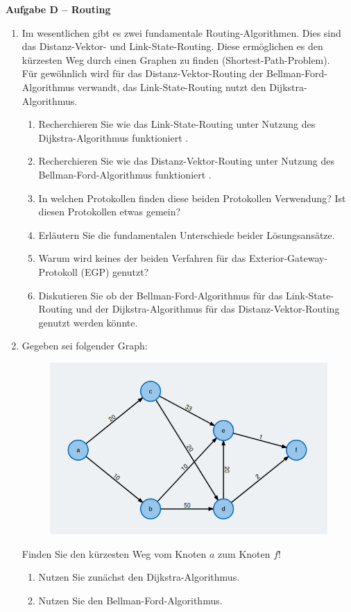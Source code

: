 \documentclass[paper=a4,fontsize=11pt]{scrartcl}%
\numberwithin{equation}{section}
\begin{document}
\begin{center}\Large{\textbf{Aufgabe D -- Routing}}\end{center}\vskip0.2in
\begin{enumerate}
	\item Im wesentlichen gibt es zwei fundamentale Routing-Algorithmen. Dies sind das Distanz-Vektor- und Link-State-Routing. Diese ermöglichen es den kürzesten Weg durch einen Graphen zu finden (Shortest-Path-Problem).\\
	Für gewöhnlich wird für das Distanz-Vektor-Routing der Bellman-Ford-Algorithmus verwandt, das Link-State-Routing nutzt den Dijkstra-Algorithmus. \cite[S. 363ff]{Kurose2012}
	\begin{enumerate}
		\item Recherchieren Sie wie das Link-State-Routing unter Nutzung des Dijkstra-Algorithmus funktioniert \cite[S. 366]{Kurose2012}.
		\item Recherchieren Sie wie das Distanz-Vektor-Routing unter Nutzung des Bellman-Ford-Algorithmus funktioniert  \cite[S. 371]{Kurose2012}.
		\item In welchen Protokollen finden diese beiden Protokollen Verwendung? Ist diesen Protokollen etwas gemein?
		\item Erläutern Sie die fundamentalen Unterschiede beider Lösungsansätze.
		\item Warum wird keines der beiden Verfahren für das Exterior-Gateway-Protokoll (EGP) genutzt?
		\item Diskutieren Sie ob der Bellman-Ford-Algorithmus für das Link-State-Routing und der Dijkstra-Algorithmus für das Distanz-Vektor-Routing genutzt werden könnte.
	\end{enumerate}
	\item Gegeben sei folgender Graph:
	\begin{figure}[H]
		\centering
		\includegraphics[scale=0.4]{dijkstra_example}
	\end{figure}
	Finden Sie den kürzesten Weg vom Knoten $a$ zum Knoten $f$!
	\begin{enumerate}
		\item Nutzen Sie zunächst den Dijkstra-Algorithmus.
		\item Nutzen Sie den Bellman-Ford-Algorithmus.
	\end{enumerate}
\end{enumerate}
\end{document}
